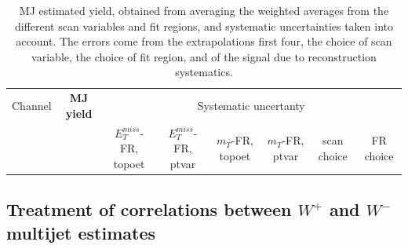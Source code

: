 \begin{table}[htbp]
\scriptsize
\begin{center}
 \begin{tabular}{ | c | c | c | c | c | c | c | c | } 
\hline
Channel & \textbf{MJ yield} & \multicolumn{6}{|c|}{Systematic uncertanty} \\
 &  & $E_T^{miss}$-FR, topoet & $E_T^{miss}$-FR, ptvar & $m_T$-FR, topoet & $m_T$-FR, ptvar & scan choice & FR choice \\
\hline

  \hline
\end{tabular}
\caption{
MJ estimated yield, obtained from averaging the weighted averages from the different scan variables and fit regions, and systematic uncertainties taken into account. 
The errors come from the extrapolations first four, the choice of scan variable, the choice of fit region, and  of the signal due to reconstruction systematics.
}%
\label{tbl:bkg_mj_wmu_wa_total}
\end{center}
\end{table}


\subsection{Treatment of correlations between $W^+$ and $W^-$ multijet estimates}
\label{sec:bkg_mj_WplusWminus}